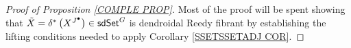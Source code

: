 \documentclass[a4paper,10pt
 ,draft
]{article}%
\begin{document}
\begin{proof}[Proof of Proposition \ref{COMPLE PROP}]

Most of the proof will be spent showing that 
$\tilde{X} = \delta^{\**}\left(X^{J^{\bullet}}\right) \in \mathsf{sdSet}^G$ is dendroidal Reedy fibrant
by establishing the lifting conditions needed to apply 
Corollary \ref{SSETSSETADJ COR}.



\end{proof}
\end{document}
